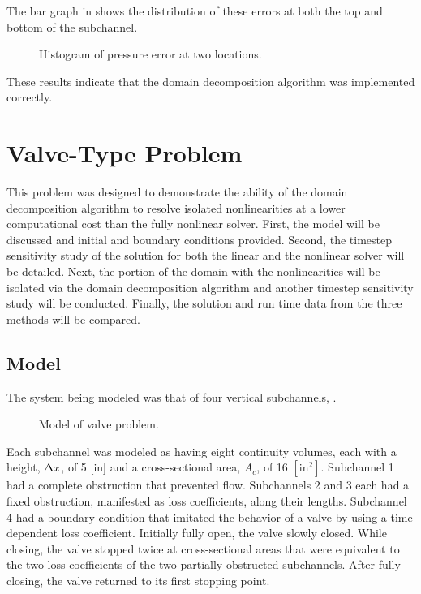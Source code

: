 The bar graph in  shows the distribution of these errors at both the top and bottom of the subchannel.

\begin{figure}[h!tb]
\centering

\caption{Histogram of pressure error at two locations.}
\label{fig:complexBar}
\end{figure}

These results indicate that the domain decomposition algorithm was implemented correctly.

\FloatBarrier
\section{Valve-Type Problem}
\label{sect:valveProblem}

This problem was designed to demonstrate the ability of the domain decomposition algorithm to resolve isolated nonlinearities at a lower computational cost than the fully nonlinear solver. 
First, the model will be discussed and initial and boundary conditions provided.
Second, the timestep sensitivity study of the solution for both the linear and the nonlinear solver will be detailed.
Next, the portion of the domain with the nonlinearities will be isolated via the domain decomposition algorithm and another timestep sensitivity study will be conducted.
Finally, the solution and run time data from the three methods will be compared.

\subsection{Model}
\label{subsect:valveModel}

The system being modeled was that of four vertical subchannels, .

\begin{figure}[h!tb]
\centering

\caption{Model of valve problem.}
\label{fig:valveModel}
\end{figure}

Each subchannel was modeled as having eight continuity volumes, each with a height, $\dx{}$, of 5 [in] and a cross-sectional area, $ A_{c} $, of 16 $[\text{in}^{2}]$.
Subchannel 1 had a complete obstruction that prevented flow.
Subchannels 2 and 3 each had a fixed obstruction, manifested as loss coefficients, along their lengths.
Subchannel 4 had a boundary condition that imitated the behavior of a valve by using a time dependent loss coefficient.
Initially fully open, the valve slowly closed.
While closing, the valve stopped twice at cross-sectional areas that were equivalent to the two loss coefficients of the two partially obstructed subchannels.
After fully closing, the valve returned to its first stopping point.

